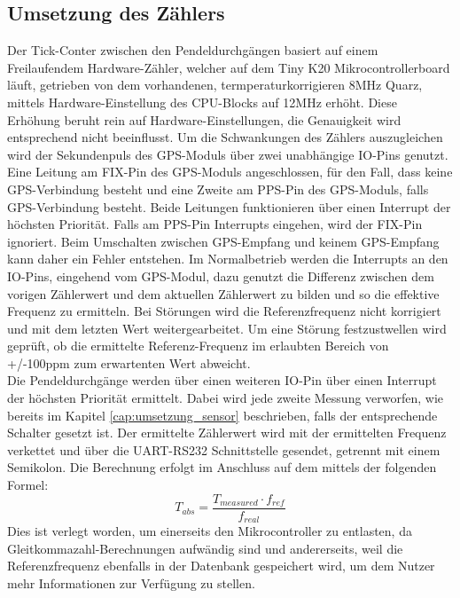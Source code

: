 \subsection{Umsetzung des Zählers}
Der Tick-Conter zwischen den Pendeldurchgängen basiert auf einem Freilaufendem Hardware-Zähler, welcher auf dem Tiny K20 Mikrocontrollerboard läuft, getrieben von dem vorhandenen, termperaturkorrigieren 8MHz Quarz, mittels Hardware-Einstellung des CPU-Blocks auf 12MHz erhöht. Diese Erhöhung beruht rein auf Hardware-Einstellungen, die Genauigkeit wird entsprechend nicht beeinflusst.
Um die Schwankungen des Zählers auszugleichen wird der Sekundenpuls des GPS-Moduls über zwei unabhängige IO-Pins genutzt. Eine Leitung am FIX-Pin des GPS-Moduls angeschlossen, für den Fall, dass keine GPS-Verbindung besteht und eine Zweite am PPS-Pin des GPS-Moduls, falls GPS-Verbindung besteht.
Beide Leitungen funktionieren über einen Interrupt der höchsten Priorität. Falls am PPS-Pin Interrupts eingehen, wird der FIX-Pin ignoriert. Beim Umschalten zwischen GPS-Empfang und keinem GPS-Empfang kann daher ein Fehler entstehen. Im Normalbetrieb werden die Interrupts an den IO-Pins, eingehend vom GPS-Modul, dazu genutzt die Differenz zwischen dem vorigen Zählerwert und dem aktuellen Zählerwert zu bilden und so die effektive Frequenz zu ermitteln. Bei Störungen wird die Referenzfrequenz nicht korrigiert und mit dem letzten Wert weitergearbeitet. Um eine Störung festzustwellen wird geprüft, ob die ermittelte Referenz-Frequenz im erlaubten Bereich von +/-100ppm zum erwartenten Wert abweicht.\\ 
Die Pendeldurchgänge werden über einen weiteren IO-Pin über einen Interrupt der höchsten Priorität ermittelt. Dabei wird jede zweite Messung verworfen, wie bereits im Kapitel \ref{cap:umsetzung_sensor} beschrieben, falls der entsprechende Schalter gesetzt ist. Der ermittelte Zählerwert wird mit der ermittelten Frequenz verkettet und über die UART-RS232 Schnittstelle gesendet, getrennt mit einem Semikolon. Die Berechnung erfolgt im Anschluss auf dem \rpi mittels der folgenden Formel:
\[
	T_{abs} = \frac{T_{measured} \cdot f_{ref}}{f_{real}}
\]
Dies ist verlegt worden, um einerseits den Mikrocontroller zu entlasten, da Gleitkommazahl-Berechnungen aufwändig sind und andererseits, weil die Referenzfrequenz ebenfalls in der Datenbank gespeichert wird, um dem Nutzer mehr Informationen zur Verfügung zu stellen.
